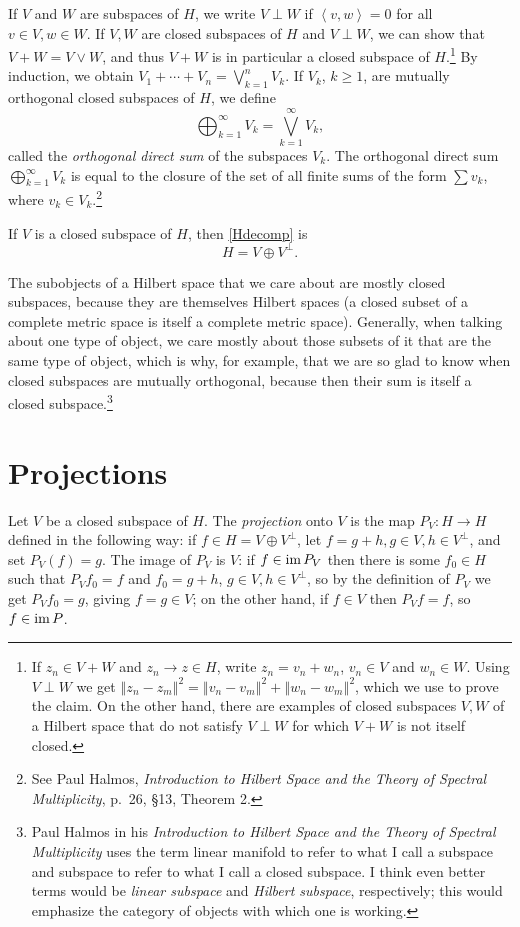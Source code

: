 \documentclass{article}
\newcommand{\inner}[2]{\left\langle #1, #2 \right\rangle}
\newcommand{\im}{\textrm{im\,}}
\newcommand{\norm}[1]{\left\Vert #1 \right\Vert}
\begin{document}
If $V$ and $W$ are subspaces of $H$, we write $V \perp W$ if $\inner{v}{w}=0$ for all $v \in V, w \in W$. If $V,W$ are closed subspaces of $H$ and
$V \perp W$, we
can show that $V+W=V \vee W$, and thus $V+W$ is in particular a closed subspace of $H$.\footnote{If $z_n \in V+W$ and $z_n \to z \in H$, write $z_n=v_n+w_n$,
$v_n \in V$ and $w_n \in W$. Using $V \perp W$ we get $\norm{z_n-z_m}^2=\norm{v_n-v_m}^2+\norm{w_n-w_m}^2$, which we use to
prove the claim. On the other hand, there are examples of closed subspaces $V,W$ of a Hilbert space that do not satisfy $V \perp W$ for
which $V+W$ is not itself closed.}   By induction, we obtain $V_1 + \cdots+V_n = \bigvee_{k=1}^n V_k$. 
If $V_k$, $k \geq 1$, are mutually orthogonal closed subspaces of $H$, we define
\[
\bigoplus_{k=1}^\infty V_k= \bigvee_{k=1}^\infty V_k,
\]
called the  {\em orthogonal direct sum} of the subspaces $V_k$. The orthogonal direct sum $\bigoplus_{k=1}^\infty V_k$ is equal
to the closure of the set of all  finite sums of the form $\sum  v_k$, where $v_k \in V_k$.\footnote{See
Paul
Halmos, {\em Introduction to Hilbert Space and the Theory of Spectral Multiplicity}, p.~26, \S 13, Theorem 2.}

If $V$ is a closed subspace of $H$, then \eqref{Hdecomp} is
\[
H=V \oplus V^\perp.
\]

The subobjects of a Hilbert space that we care about are mostly closed subspaces, because they are themselves Hilbert spaces (a closed subset
of a complete metric space is itself a complete metric space). Generally, when talking about one type of object, we care mostly about those
subsets of it that are the same type of object, which is why, for example, that we are so glad to know when closed subspaces are mutually orthogonal, because
then  their sum is itself a closed subspace.\footnote{Paul
Halmos in his {\em Introduction to Hilbert Space and the Theory of Spectral Multiplicity} uses the term linear manifold to
refer to what I call a  subspace and subspace to refer to what I call a closed subspace. I think even better terms
would be {\em linear subspace} and {\em Hilbert subspace}, respectively; this would emphasize the category of objects with  which one is working.}

\section{Projections}
Let $V$ be a closed subspace of $H$.
The {\em  projection} onto $V$ is the map $P_V:H \to H$ defined in the following way: if $f \in H=V \oplus V^\perp$, let $f=g+h, g \in V, h \in V^\perp$, and set $P_V(f)=g$. The image of $P_V$ is $V$:
if $f \in \im P_V$ then there is some $f_0 \in H$ such that $P_V f_0 =f$ and $f_0=g+h$, $g \in V, h \in V^\perp$, so by
the definition of $P_V$ we get $P_V f_0=g$, giving $f=g \in V$; on the other hand, if $f \in V$ then $P_V f = f$, so $f \in \im P$.
\end{document}
